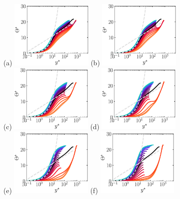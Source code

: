 \documentclass[lineno]{jfm}
\begin{document}
	\begin{figure}
        \centering
                (a) \includegraphics[width=4cm]{Figures/prof_ttstar_rotz0_roty0.00390625.eps}
                (b) \includegraphics[width=4cm]{Figures/prof_ttstar_rotz0_roty0.0078125.eps} \\
                (c) \includegraphics[width=4cm]{Figures/prof_ttstar_rotz0_roty0.015625.eps}
                (d) \includegraphics[width=4cm]{Figures/prof_ttstar_rotz0_roty0.03125.eps} \\
                (e) \includegraphics[width=4cm]{Figures/prof_ttstar_rotz0_roty0.0625.eps}
                (f) \includegraphics[width=4cm]{Figures/prof_ttstar_rotz0_roty0.125.eps} \\

\end{figure}
\end{document}

